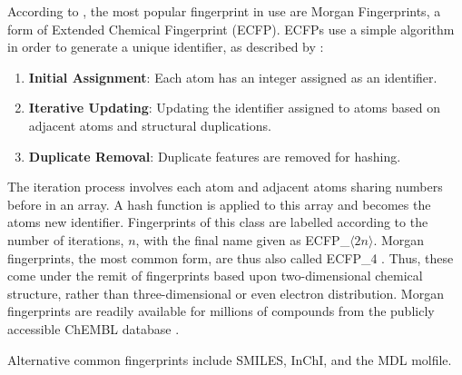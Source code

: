 According to \textcite{Cap20}, the most popular fingerprint in use are Morgan Fingerprints, a form of Extended Chemical Fingerprint (ECFP). ECFPs use a simple algorithm in order to generate a unique identifier, as described by \textcite{Mor2020}:

\begin{enumerate}
  \item \textbf{Initial Assignment}: Each atom has an integer assigned as an identifier.
  \item \textbf{Iterative Updating}: Updating the identifier assigned to atoms based on adjacent atoms and structural duplications.
  \item \textbf{Duplicate Removal}: Duplicate features are removed for hashing.
\end{enumerate}

The iteration process involves each atom and adjacent atoms sharing numbers before in an array. A hash function is applied to this array and becomes the atoms new identifier. Fingerprints of this class are labelled according to the number of iterations, $n$, with the final name given as ECFP\_$\langle{}2n\rangle{}$. Morgan fingerprints, the most common form, are thus also called ECFP\_4 \cite{Cap20, Mor2020}. Thus, these come under the remit of fingerprints based upon two-dimensional chemical structure, rather than three-dimensional or even electron distribution. Morgan fingerprints are readily available for millions of compounds from the publicly accessible ChEMBL database \cite{CHEMBL}.

Alternative common fingerprints include SMILES, InChI, and the MDL molfile.